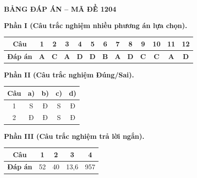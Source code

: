 \vspace{0.4cm}
\noindent\begin{minipage}{\linewidth}
\begin{center}{\large\bfseries\color{red!80!black} BẢNG ĐÁP ÁN -- MÃ ĐỀ 1204}\end{center}
\vspace{0.15cm}
\noindent\textbf{Phần I (Câu trắc nghiệm nhiều phương án lựa chọn).}\par\smallskip
\begin{center}
\begin{tabular}{|c|c|c|c|c|c|c|c|c|c|c|c|c|}\hline
\textbf{Câu} & 1 & 2 & 3 & 4 & 5 & 6 & 7 & 8 & 9 & 10 & 11 & 12 \\ \hline
\textbf{Đáp án} & \textbf{A} & \textbf{C} & \textbf{A} & \textbf{D} & \textbf{D} & \textbf{B} & \textbf{A} & \textbf{D} & \textbf{C} & \textbf{C} & \textbf{A} & \textbf{D} \\ \hline
\end{tabular}
\end{center}
\noindent\textbf{Phần II (Câu trắc nghiệm Đúng/Sai).}\par\smallskip
\begin{center}
\begin{tabular}{|c|c|c|c|c|}\hline
\textbf{Câu} & \textbf{a)} & \textbf{b)} & \textbf{c)} & \textbf{d)} \\ \hline
1 & S & Đ & S & Đ \\ \hline
2 & Đ & Đ & S & Đ \\ \hline
\end{tabular}
\end{center}
\noindent\textbf{Phần III (Câu trắc nghiệm trả lời ngắn).}\par\smallskip
\begin{center}
\begin{tabular}{|c|c|c|c|c|}\hline
\textbf{Câu} & 1 & 2 & 3 & 4 \\ \hline
\textbf{Đáp án} & 52 & 40 & 13,6 & 957 \\ \hline
\end{tabular}
\end{center}
\end{minipage}

